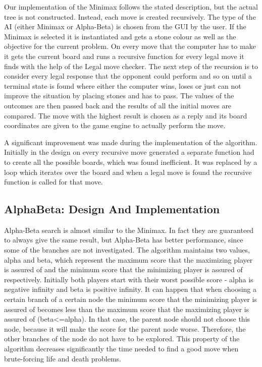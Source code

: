 \documentclass{l3proj}
\begin{document}
Our implementation of the Minimax follows the stated description, but the actual tree is not constructed. Instead, each move is created recursively. The type of the AI (either Minimax or Alpha-Beta) is chosen from the GUI by the user. If the Minimax is selected it is instantiated and gets a stone colour as well as the objective for the current problem.  
On every move that the computer has to make it gets the current board and runs a recursive function for every legal move it finds with the help of the Legal move checker. The next step of the recursion is to consider every legal response that the opponent could perform and so on until a terminal state is found where either the computer wins, loses or just can not improve the situation by placing stones and has to pass. The values of the outcomes are then passed back and the results of all the initial moves are compared. The move with the highest result is chosen as a reply and its board coordinates are given to the game engine to actually perform the move.

A significant improvement was made during the implementation of the algorithm. Initially in the design on every recursive move generated a separate function had to create all the possible boards, which was found inefficient. It was replaced by a loop which iterates over the board and when a legal move is found the recursive function is called for that move.


\subsection{AlphaBeta: Design And Implementation}

Alpha-Beta search is almost similar to the Minimax. In fact they are guaranteed to always give the same result, but Alpha-Beta has better performance, since some of the branches are not investigated. The algorithm maintains two values, alpha and beta, which represent the maximum score that the maximizing player is assured of and the minimum score that the minimizing player is assured of respectively. Initially both players start with their worst possible score - alpha is negative infinity and beta is positive infinity. It can happen that when choosing a certain branch of a certain node the minimum score that the minimizing player is assured of becomes less than the maximum score that the maximizing player is assured of (beta<=alpha). In that case, the parent node should not choose this node, because it will make the score for the parent node worse. Therefore, the other branches of the node do not have to be explored. This property of the algorithm decreases significantly the time needed to find a good move when brute-forcing life and death problems.
\end{document}
